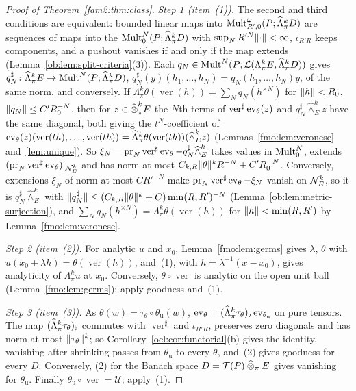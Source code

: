 \begin{proof}[Proof of Theorem~\ref{fam2:thm:class}]
\emph{Step 1 (item~(1)).} The second and third conditions are equivalent: bounded linear maps into
$\operatorname{Mult}^\omega_{R',0}(P;\widehat\Lambda^k_\pi D)$ are sequences of maps into the $\operatorname{Mult}^N_0(P;\widehat\Lambda^k_\pi D)$ with
$\sup_NR'^N\lVert \cdot\rVert<\infty$, $\iota_{R'R}$ keeps components, and a pushout vanishes if and only if the map extends
(Lemma~\ref{ob:lem:split-criteria}(3)). Each $q_N\in\operatorname{Mult}^N(P;\mathcal L(\Lambda^k_\pi E,\widehat\Lambda^k_\pi D))$ gives
$q_N^\sharp\colon\widehat\Lambda^k_\pi E\to\operatorname{Mult}^N(P;\widehat\Lambda^k_\pi D)$, $q_N^\sharp(y)(h_1,\dots,h_N)=q_N(h_1,\dots,h_N)y$, of the
same norm, and conversely. If $\Lambda^k_\pi\theta(\operatorname{ver}(h))=\sum_Nq_N(h^{\times N})$ for $\lVert h\rVert<R_0$,
$\lVert q_N\rVert\le C'R_0^{-N}$, then for $z\in\mathbin{\widehat\otimes}^k_\pi E$ the $N$th terms of $\operatorname{ver}^\sharp\operatorname{ev}_\theta(z)$ and
$q_N^\sharp\widehat\wedge^k_Ez$ have the same diagonal, both giving the $t^N$-coefficient of
$\operatorname{ev}_\theta(z)(\operatorname{ver}(th),\dots,\operatorname{ver}(th))=\widehat\Lambda^k_\pi\theta(\operatorname{ver}(th))
(\widehat\wedge^k_Ez)$ (Lemmas~\ref{fmo:lem:veronese} and~\ref{lem:unique}). So
$\xi_N=\operatorname{pr}_N\operatorname{ver}^\sharp\operatorname{ev}_\theta-q_N^\sharp\widehat\wedge^k_E$ takes values in
$\operatorname{Mult}^N_0$, extends $(\operatorname{pr}_N\operatorname{ver}^\sharp
\operatorname{ev}_\theta)|_{\mathcal N^k_E}$ and has norm at most $C_{k,R}\lVert \theta\rVert^kR^{-N}+C'R_0^{-N}$. Conversely, extensions $\xi_N$ of norm
at most $CR'^{-N}$ make $\operatorname{pr}_N\operatorname{ver}^\sharp\operatorname{ev}_\theta-\xi_N$ vanish on $\mathcal N^k_E$, so it is
$q_N^\sharp\widehat\wedge^k_E$ with $\lVert q_N^\sharp\rVert\le(C_{k,R}\lVert \theta\rVert^k+C)\min(R,R')^{-N}$
(Lemma~\ref{ob:lem:metric-surjection}), and $\sum_Nq_N(h^{\times N})=\Lambda^k_\pi\theta(\operatorname{ver}(h))$ for
$\lVert h\rVert<\min(R,R')$ by Lemma~\ref{fmo:lem:veronese}.

\emph{Step 2 (item~(2)).} For analytic $u$ and $x_0$, Lemma~\ref{fmo:lem:germs} gives $\lambda$, $\theta$ with
$u(x_0+\lambda h)=\theta(\operatorname{ver}(h))$, and~(1), with $h=\lambda^{-1}(x-x_0)$, gives analyticity of
$\Lambda^k_\pi u$ at $x_0$. Conversely, $\theta\circ\operatorname{ver}$ is analytic on the open unit ball
(Lemma~\ref{fmo:lem:germs}); apply goodness and~(1).

\emph{Step 3 (item~(3)).} As $\theta(w)=\tau_\theta\circ\theta_{\mathrm u}(w)$, $\operatorname{ev}_\theta=(\widehat\Lambda^k_\pi\tau_\theta)_\flat
\operatorname{ev}_{\theta_{\mathrm u}}$ on pure tensors. The map $(\widehat\Lambda^k_\pi\tau_\theta)_\flat$ commutes with
$\operatorname{ver}^\sharp$ and $\iota_{R'R}$, preserves zero diagonals and has norm at most $\lVert \tau_\theta\rVert^k$; so
Corollary~\ref{ocl:cor:functorial}(b) gives the identity, vanishing after shrinking passes from $\theta_{\mathrm u}$ to every
$\theta$, and~(2) gives goodness for every $D$. Conversely, (2) for the Banach space $D=\mathcal T(P)\mathbin{\widehat\otimes}_\pi E$ gives
vanishing for $\theta_{\mathrm u}$. Finally $\theta_{\mathrm u}\circ\operatorname{ver}=\mathcal U$; apply~(1).
\end{proof}

